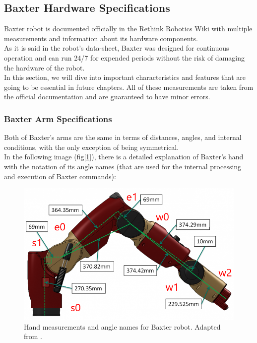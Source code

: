 \documentclass[11pt]{report} %
\begin{document}
\subsection{Baxter Hardware Specifications}

Baxter robot is documented officially in the Rethink Robotics Wiki with multiple measurements and information about its hardware components.\\

As it is said in the robot's data-sheet, Baxter was designed for continuous operation and can run 24/7 for expended periods without the risk of damaging the hardware of the robot\citep{cite_baxter_hardware_specifications}. \\

In this section, we will dive into important characteristics and features that are going to be essential in future chapters. All of these measurements are taken from the official documentation and are guaranteed to have minor errors.\\

\subsubsection{Baxter Arm Specifications}

Both of Baxter's arms are the same in terms of distances, angles, and internal conditions, with the only exception of being symmetrical.\\

In the following image (fig[\ref{fig_baxter_hand_measurements}]), there is a detailed explanation of Baxter's hand with the notation of its angle names (that are used for the internal processing and execution of Baxter commands):

\begin{figure}[H]
    \centering
    \includegraphics[width=0.7\linewidth]{assets/imgs/baxter_robot/baxter_arm_specifications.png}
    \caption{Hand measurements and angle names for Baxter robot. Adapted from \citep{cite_baxter_hardware_specifications}.} 
    \label{fig_baxter_hand_measurements}
\end{figure}
\end{document}
